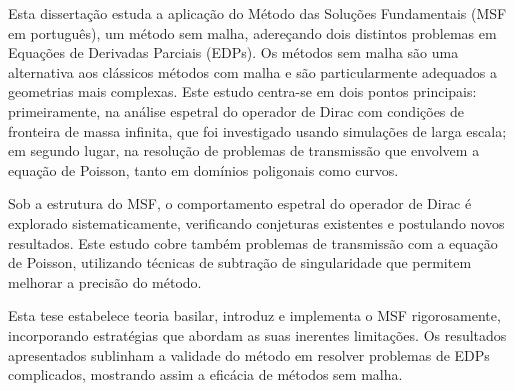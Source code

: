 \acresetall
\noindent
Esta dissertação estuda a aplicação do Método das Soluções Fundamentais (MSF em português), um método sem malha, adereçando dois distintos problemas em Equações de Derivadas Parciais (EDPs). Os métodos sem malha são uma alternativa aos clássicos métodos com malha e são particularmente adequados a geometrias mais complexas. Este estudo centra-se em dois pontos principais: primeiramente, na análise espetral do operador de Dirac com condições de fronteira de massa infinita, que foi investigado usando simulações de larga escala; em segundo lugar, na resolução de problemas de transmissão que envolvem a equação de Poisson, tanto em domínios poligonais como curvos.

Sob a estrutura do MSF, o comportamento espetral do operador de Dirac é explorado sistematicamente, verificando conjeturas existentes e postulando novos resultados. Este estudo cobre também problemas de transmissão com a equação de Poisson, utilizando técnicas de subtração de singularidade que permitem melhorar a precisão do método.

Esta tese estabelece teoria basilar, introduz e implementa o MSF rigorosamente, incorporando estratégias que abordam as suas inerentes limitações. Os resultados apresentados sublinham a validade do método em resolver problemas de EDPs complicados, mostrando assim a eficácia de métodos sem malha.